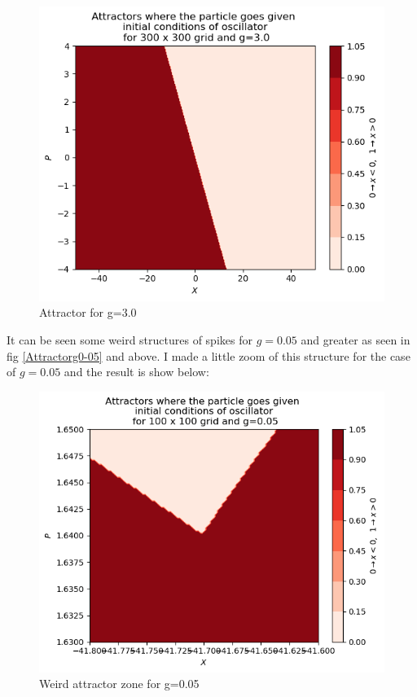 \documentclass[idxtotoc,hyperref,openany]{labbook} %
\begin{document}
\begin{figure}[H] %
\begin{center}
\includegraphics[width=1\linewidth]{attractor020.png}
\end{center}
\caption{Attractor for g=3.0}
\label{Attractorg3}
\end{figure}

It can be seen some weird structures of spikes for $g=0.05$ and greater as seen in fig \ref{Attractorg0-05} and above. I made a little zoom of this structure for the case of $g=0.05$ and the result is show below:

\begin{figure}[H] %
\begin{center}
\includegraphics[width=1\linewidth]{zonararag0-05CalvoSanz.png}
\end{center}
\caption{Weird attractor zone for g=0.05}
\label{WeirdAttractorg0-05}
\end{figure}
\end{document}
